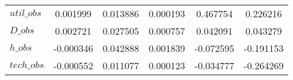 \begin{center}
\begin{longtable}{lccccc}
$util\_obs      $	 & 	        0.001999	 & 	        0.013886	 & 	        0.000193	 & 	        0.467754	 & 	        0.226216 \\ 
$D\_obs         $	 & 	        0.002721	 & 	        0.027505	 & 	        0.000757	 & 	        0.042091	 & 	        0.043279 \\ 
$h\_obs         $	 & 	       -0.000346	 & 	        0.042888	 & 	        0.001839	 & 	       -0.072595	 & 	       -0.191153 \\ 
$tech\_obs      $	 & 	       -0.000552	 & 	        0.011077	 & 	        0.000123	 & 	       -0.034777	 & 	       -0.264269 \\ 
\end{longtable}
 \end{center}
